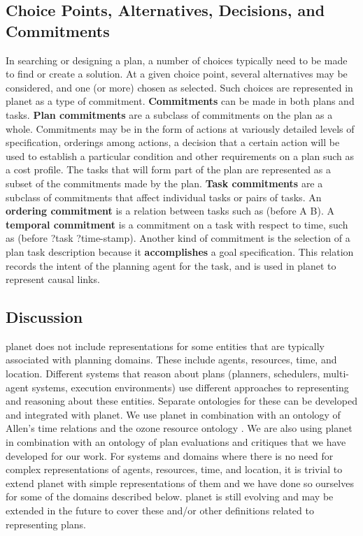 \subsection{Choice Points, Alternatives, Decisions, and Commitments}

In searching or designing a plan, a number of
choices typically need to be made to find or create a solution.
At a given choice point, several alternatives may be considered, and 
one (or more) chosen as selected.  
Such choices are represented in {\sc planet} as a type of commitment.
{\bf Commitments} can be made in both plans and tasks.
{\bf Plan commitments} are a subclass of commitments 
on the plan as a whole.  
Commitments may be in the form of actions at variously detailed levels
of specification, orderings among actions, a decision that a certain
action will be used to establish a particular condition and other
requirements on a plan such as a cost profile.
The tasks that will form part of the plan
are represented as a subset of the commitments made by the plan.
{\bf Task commitments} are a subclass of commitments 
that affect individual tasks or pairs of tasks.  
An {\bf ordering commitment} is a relation between tasks such as
(before A B).  A {\bf temporal commitment} is a commitment 
on a task with respect
to time, such as (before ?task ?time-stamp).  
Another kind of commitment is the selection of a plan task 
description because it {\bf accomplishes}
a goal specification.  
This relation records the intent 
of the planning agent for the task, 
and is used in {\sc planet} to represent causal links.  


\subsection{Discussion}

{\sc planet} does not include representations for 
some entities that are typically associated with planning domains.
These include agents, resources, time, and location.  
Different systems that reason about plans 
(planners, schedulers, multi-agent systems, execution environments) use 
different approaches to representing and reasoning about these entities.
Separate ontologies for these can be developed and 
integrated with {\sc planet}.  
We use {\sc planet} in combination with an ontology of 
Allen's time relations \cite{allen83} and the {\sc ozone} resource ontology
\cite{smith96}.
We are also using {\sc planet} in combination with an
ontology of plan evaluations and critiques that we have developed
for our work.
For systems and domains where there is no need for complex 
representations of agents, resources, time, and location,
it is trivial to extend {\sc planet} 
with simple representations of them
and we have done so ourselves 
for some of the domains described below.
{\sc planet} is still evolving and may be extended in the future 
to cover these and/or 
other definitions related to representing plans.  


